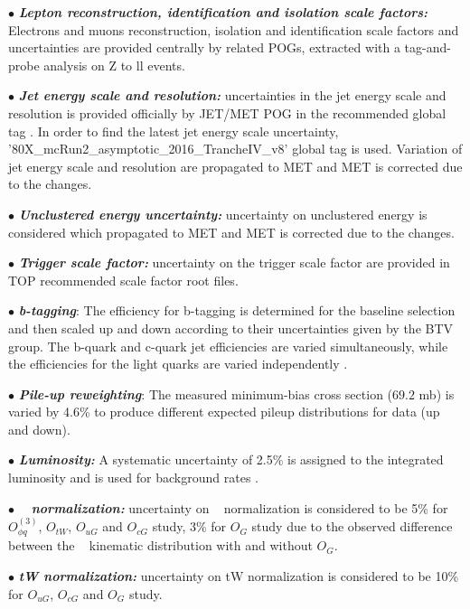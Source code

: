\clearpage





$\bullet$ \textit{\textbf{Lepton reconstruction, identification and isolation scale factors:}} Electrons and muons reconstruction, isolation and identification scale factors and uncertainties are provided centrally by related POGs, extracted with a tag-and-probe analysis on Z to ll events.

$\bullet$ \textit{\textbf{Jet energy scale and resolution:}} uncertainties in the jet energy scale and resolution is provided officially by JET/MET POG in the recommended global tag \cite{GT}.
In order to find the latest jet energy scale uncertainty, '80X\_mcRun2\_asymptotic\_2016\_TrancheIV\_v8' global tag is used.
Variation of jet energy scale and resolution are propagated to MET and MET is corrected due to the changes.

$\bullet$ \textit{\textbf{Unclustered energy  uncertainty:}} uncertainty on unclustered energy is considered which propagated to MET and MET is corrected due to the changes.

$\bullet$ \textit{\textbf{Trigger scale factor:}} uncertainty on the  trigger scale factor are provided in TOP recommended scale factor root files.

$\bullet$  \textit{\textbf{b-tagging}}: The efficiency for b-tagging is determined for the baseline selection and then scaled up and down according to their uncertainties given by the BTV group. The b-quark and c-quark jet efficiencies are varied simultaneously, while the efficiencies for the light quarks are varied independently \cite{btag}.

$\bullet$  \textit{\textbf{Pile-up reweighting}}: The measured minimum-bias cross section ($69.2$ mb) is varied by 4.6\% to produce
different expected pileup distributions for data (up and down).

$\bullet$ \textit{\textbf{Luminosity:}} A systematic uncertainty of 2.5\% is assigned to the integrated luminosity
and is used for background rates \cite{CMS-PAS-LUM-17-001}.

$\bullet$ \textit{\textbf{\ttbar~ normalization:}} uncertainty on \ttbar~ normalization is considered to be  5\% \cite{Khachatryan:2016kzg} for $O_{\phi q}^{(3)}$, $O_{tW}$, $O_{uG}$ and $O_{cG}$ study, 3\% for $O_{G}$ study due to the observed difference between the \ttbar~ kinematic distribution with and without $O_{G}$.

$\bullet$ \textit{\textbf{tW normalization:}} uncertainty on tW normalization is considered to be  10\% for $O_{uG}$, $O_{cG}$ and $O_{G}$ study.

